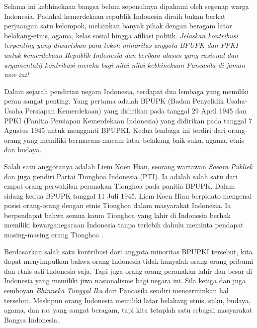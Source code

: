 \documentclass[
  12pt,
  answers  
]{exam}
\begin{document}
\begin{questions}
      \question
      Selama ini kebhinekaan bangsa belum sepenuhnya dipahami oleh segenap warga Indonesia. Padahal kemerdekaan republik Indonesia diraih bukan berkat perjuangan satu kelompok, melainkan banyak pihak dengan beragam latar belakang-etnis, agama, kelas sosial hingga afiliasi politik. \emph{Jelaskan kontribusi terpenting yang diwariskan para tokoh minoritas anggota BPUPK dan PPKI untuk kemerdekaan Republik Indonesia dan berikan alasan yang rasional dan argumentatif kontribusi mereka bagi nilai-nilai kebhinekaan Pancasila di jaman now ini!}     
      \begin{solution}
        Dalam sejarah pendirian negara Indonesia, terdapat dua lembaga yang memiliki peran sangat penting. Yang pertama adalah BPUPK (Badan Penyelidik Usaha-Usaha Persiapan Kemerdekaan) yang didirikan pada tanggal 29 April 1945 dan PPKI (Panitia Persiapan Kemerdekaan Indonesia) yang didirikan pada tanggal 7 Agustus 1945 untuk mengganti BPUPKI. Kedua lembaga ini terdiri dari orang-orang yang memiliki bermacam-macam latar belakang baik suku, agama, etnis dan budaya.

        Salah satu anggotanya adalah Liem Koen Hian, seorang wartawan \emph{Soeara Publiek} dan juga pendiri Partai Tionghoa Indonesia (PTI). Ia adalah salah satu dari empat orang perwakilan peranakan Tionghoa pada panitia BPUPK. Dalam sidang kedua BPUPK tanggal 11 Juli 1945, Liem Koen Hian berpidato mengenai posisi orang-orang dengan etnis Tionghoa dalam masyarakat Indonesia. Ia berpendapat bahwa semua kaum Tionghoa yang lahir di Indonesia berhak memiliki kewarganegaraan Indonesia tanpa terlebih dahulu meminta pendapat masing-masing orang Tionghoa \cite{dawaOrangTionghoaDalam2009}. 

        Berdasarkan salah satu kontribusi dari anggota minoritas BPUPKI tersebut, kita dapat menyimpulkan bahwa orang Indonesia tidak hanyalah orang-orang pribumi dan etnis asli Indonesia saja. Tapi juga orang-orang peranakan lahir dan besar di Indonesia yang memiliki jiwa nasionalisme bagi negara ini. Sila ketiga dan juga semboyan \emph{Bhinneka Tunggal Ika} dari Pancasila sendiri mencerminkan hal tersebut. Meskipun orang Indonesia memiliki latar belakang etnis, suku, budaya, agama, dan ras yang sangat beragam, tapi kita tetaplah satu sebagai masyarakat Bangsa Indonesia.
      \end{solution}
    \end{questions}

    \pagebreak
\printbibliography

		
\end{document}
